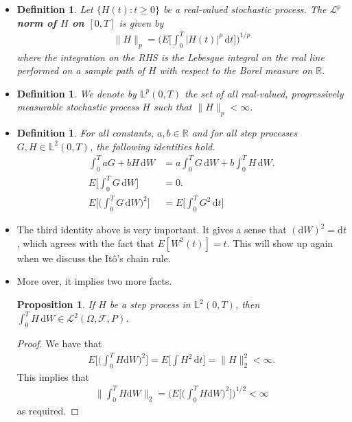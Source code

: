\documentclass[10pt]{article}
\newtheorem{definition}[lemma]{Definition}
\newtheorem{proposition}[lemma]{Proposition}
\newcommand{\dee}{\mathrm{d}}
\newcommand{\mcal}[1]{\mathcal{#1}}
\newcommand{\Real}{\mathbb{R}}
\begin{document}
\begin{itemize}
  \item \begin{definition}
    Let $\{H(t) : t \geq 0\}$ be a real-valued stochastic process. The {\bf $\mcal{L}^p$ norm of $H$ on $[0,T]$} is given by
    \begin{align*}
      \| H \|_p = \bigg( E \bigg[ \int_0^T |H(t)|^p\, \dee t \bigg] \bigg)^{1/p}
    \end{align*}
    where the integration on the RHS is the Lebesgue integral on the real line performed on a sample path of $H$ with respect to the Borel measure on $\Real$.
  \end{definition}

  \item \begin{definition}
    We denote by $\mathbb{L}^p(0,T)$ the set of all real-valued, progressively measurable stochastic process $H$ such that $\| H \|_p < \infty$.    
  \end{definition}

  \item \begin{definition}
    For all constants, $a, b \in \Real$ and for all step processes $G, H \in \mathbb{L}^2(0,T)$, the following identities hold.
    \begin{align*}
      \int_0^T aG + bH\, \dee W &= a \int_0^T G\, \dee W + b \int_0^T H\, \dee W. \\
      E\bigg[ \int_0^T G\, \dee W \bigg] &= 0. \\
      E\bigg[ \bigg( \int_0^T G\, \dee W \bigg)^2 \bigg] &= 
      E\bigg[ \int_0^T G^2\, \dee t \bigg]
    \end{align*}    
  \end{definition}

  \item The third identity above is very important. It gives a sense that $(\dee W)^2 = \dee t$, which agrees with the fact that $E[W^2(t)] = t$. This will show up again when we discuss the It\^{o}'s chain rule. 
  
  \item More over, it implies two more facts.
  
  \begin{proposition}
    If $H$ be a step process in $\mathbb{L}^2(0,T)$, then $\int_0^T H\, \dee W \in \mcal{L}^2(\Omega, \mcal{F}, P)$.
  \end{proposition}

  \begin{proof}
    We have that
    \begin{align*}
      E\bigg[ \bigg( \int_0^T H \dee W \bigg)^2 \bigg] = E \bigg[ \int H^2\, \dee t \bigg] = \| H \|_2^2 < \infty.
    \end{align*}
    This implies that
    \begin{align*}
      \bigg\| \int_0^T H \dee W \bigg\|_2
      = \bigg( E\bigg[ \bigg( \int_0^T H \dee W \bigg)^2 \bigg] \bigg)^{1/2}
      < \infty
    \end{align*}
    as required.
  \end{proof}


\end{itemize}
\end{document}
